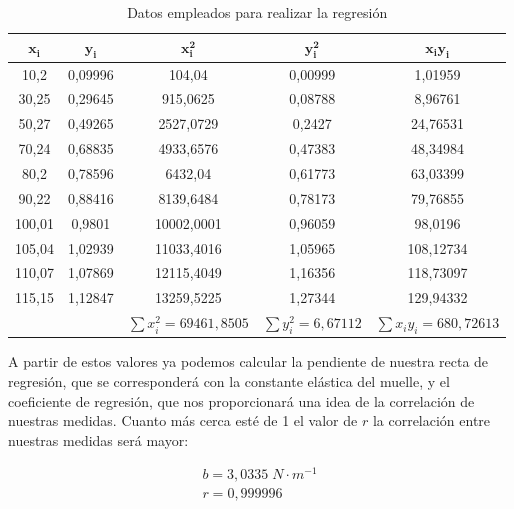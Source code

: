\documentclass[a4paper,12pt,titlepage]{article}
\begin{document}
\begin{table}[h!]
    \centering
    \begin{tabular}{cc|c|c|c|}
    \hline
    \multicolumn{1}{|c|}{$\mathbf{x_i}$} & $\mathbf{y_{i}}$ & $\mathbf{x_ {i}^2}$ & $\mathbf{y_{i}^2}$ & $\mathbf{x_{i}y_{i}}$ \\ \hline
    \multicolumn{1}{|c|}{10,2}   & 0,09996 & 104,04     & 0,00999 & 1,01959   \\ \hline
    \multicolumn{1}{|c|}{30,25}  & 0,29645 & 915,0625   & 0,08788 & 8,96761   \\ \hline
    \multicolumn{1}{|c|}{50,27}  & 0,49265 & 2527,0729  & 0,2427  & 24,76531  \\ \hline
    \multicolumn{1}{|c|}{70,24}  & 0,68835 & 4933,6576  & 0,47383 & 48,34984  \\ \hline
    \multicolumn{1}{|c|}{80,2}   & 0,78596 & 6432,04    & 0,61773 & 63,03399  \\ \hline
    \multicolumn{1}{|c|}{90,22}  & 0,88416 & 8139,6484  & 0,78173 & 79,76855  \\ \hline
    \multicolumn{1}{|c|}{100,01} & 0,9801  & 10002,0001 & 0,96059 & 98,0196   \\ \hline
    \multicolumn{1}{|c|}{105,04} & 1,02939 & 11033,4016 & 1,05965 & 108,12734 \\ \hline
    \multicolumn{1}{|c|}{110,07} & 1,07869 & 12115,4049 & 1,16356 & 118,73097 \\ \hline
    \multicolumn{1}{|c|}{115,15} & 1,12847 & 13259,5225 & 1,27344 & 129,94332 \\ \hline
                                 &         & $\sum x_i^2=69461,8505$ & $\sum y_i^2=6,67112$ & $\sum x_i y_i=680,72613$ \\ \cline{3-5} 
    \end{tabular}
    \caption{Datos empleados para realizar la regresión}
    \label{Datos regresion 1}
    \end{table}

A partir de estos valores ya podemos calcular la pendiente de nuestra recta de regresión, que se corresponderá con la constante elástica del muelle, y el coeficiente de regresión, que nos proporcionará una idea de la correlación de nuestras medidas. Cuanto más cerca esté de 1 el valor de $r$ la correlación entre nuestras medidas será mayor:

\begin{equation}
    \begin{gathered}
        b = 3,0335 \; N \cdot m^{-1} \\
        r = 0,999996
    \end{gathered}
\end{equation}
\end{document}
